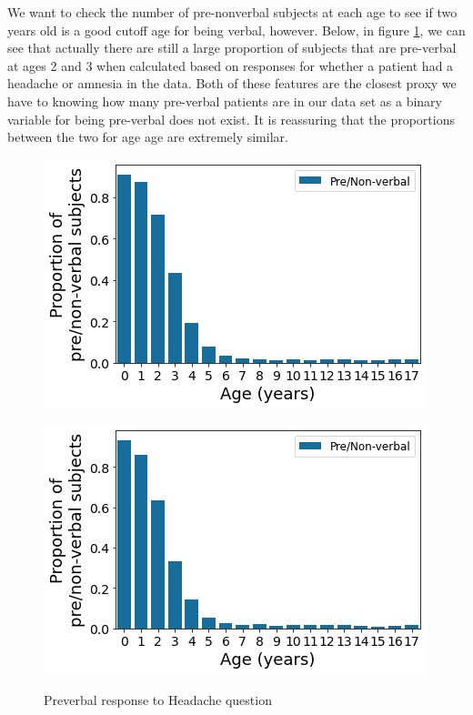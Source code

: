 \documentclass[11pt]{amsart}
\begin{document}
We want to check the number of pre-nonverbal subjects at each age to see if two years old is a good cutoff age for being verbal, however. Below, in figure \ref{fig:preverbal}, we can see that actually there are still a large proportion of subjects that are pre-verbal at ages 2 and 3 when calculated based on responses for whether a patient had a headache or amnesia in the data. Both of these features are the closest proxy we have to knowing how many pre-verbal patients are in our data set as a binary variable for being pre-verbal does not exist. It is reassuring that the proportions between the two for age age are extremely similar.
\FloatBarrier
\begin{figure}
	\begin{minipage}[b]{0.5\linewidth}
		\centering
		\includegraphics[width=\textwidth]{amnesia_preverbal.png}
		\label{fig:amnesia_preverbal}
	\end{minipage}%
	\begin{minipage}[b]{0.5\linewidth}
		\centering
		\includegraphics[width=\textwidth]{headache_preverbal.png}
		\label{fig:headache_preverbal}
	\end{minipage}
	\caption{Preverbal response to Headache question}\label{fig:preverbal}
\end{figure}
\FloatBarrier
\end{document}
